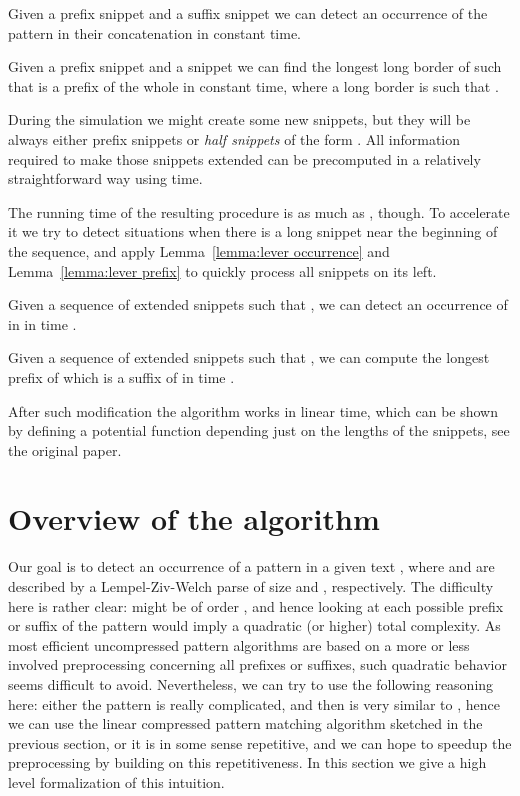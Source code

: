 \documentclass[runningheads]{llncs}
\begin{document}
\begin{lemma}\label{lemma:concatenation occurrence}
Given a prefix snippet and a suffix snippet we can detect an occurrence of the pattern in their concatenation in constant time.
\end{lemma}

\begin{lemma}\label{lemma:extending long border}
Given a prefix snippet  and a snippet  we can find the longest long border  of  such that  is a prefix of the whole  in constant time, where a long border is  such that .
\end{lemma}

During the simulation we might create some new snippets, but they will be always either prefix snippets or {\it half snippets} of the form . All information required to make those snippets extended can be precomputed in a relatively straightforward way using  time.

The running time of the resulting procedure is as much as , though. To accelerate it we try to detect situations when there is a long snippet near the beginning of the sequence, and apply Lemma~\ref{lemma:lever occurrence} and Lemma~\ref{lemma:lever prefix} to quickly process all snippets on its left.

\begin{lemma}\label{lemma:lever occurrence}
Given a sequence of extended snippets  such that , we can detect an occurrence of  in  in time .
\end{lemma}

\begin{lemma}\label{lemma:lever prefix}
Given a sequence of extended snippets  such that , we can compute the longest prefix of  which is a suffix of  in time .
\end{lemma}

After such modification the algorithm works in linear time, which can be shown by defining a potential function depending just on the lengths of the snippets, see the original paper.

\section{Overview of the algorithm}

Our goal is to detect an occurrence of a pattern  in a given text , where  and  are described by a Lempel-Ziv-Welch parse of size  and , respectively. The difficulty here is rather clear:  might be of order , and hence looking at each possible prefix or suffix of the pattern would imply a quadratic (or higher) total complexity. As most efficient uncompressed pattern algorithms are
based on a more or less involved preprocessing concerning all prefixes or suffixes, such quadratic behavior seems difficult to avoid. Nevertheless,
we can try to use the following reasoning here: either the pattern is really complicated, and then  is very similar to , hence we can use the linear compressed pattern matching algorithm sketched in the previous section, or it is in some sense repetitive, and we can hope to speedup the preprocessing by building on this repetitiveness. In this section we give a high level formalization of this intuition. 
\end{document}
